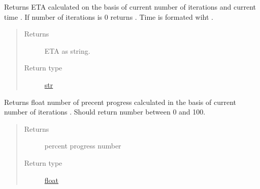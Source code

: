 \documentclass[a4paper,10pt,english]{sphinxmanual}
\begin{document}
\begin{fulllineitems}
\begin{fulllineitems}
\end{fulllineitems}


\begin{fulllineitems}
\label{aqueduct.utils.clui:aqueduct.utils.clui.SimpleProgressBar.bar}
\end{fulllineitems}


\begin{fulllineitems}
\label{aqueduct.utils.clui:aqueduct.utils.clui.SimpleProgressBar.ETA}
Returns ETA calculated on the basis of current number of iterations
 and current time . If number of
iterations is 0 returns .
Time is formated wiht {\hyperref[aqueduct.utils.clui:aqueduct.utils.clui.smart_time_string]{}}.
\begin{quote}\begin{description}
\item[{Returns}] \leavevmode
ETA as string.

\item[{Return type}] \leavevmode
\href{https://docs.python.org/2/library/functions.html\#str}{str}

\end{description}\end{quote}

\end{fulllineitems}


\begin{fulllineitems}
\label{aqueduct.utils.clui:aqueduct.utils.clui.SimpleProgressBar.percent}
Returns float number of precent progress calculated in the basis
of current number of iterations . Should return
number between 0 and 100.
\begin{quote}\begin{description}
\item[{Returns}] \leavevmode
percent progress number

\item[{Return type}] \leavevmode
\href{https://docs.python.org/2/library/functions.html\#float}{float}


\end{description}
\end{quote}
\end{fulllineitems}
\end{fulllineitems}
\end{document}

